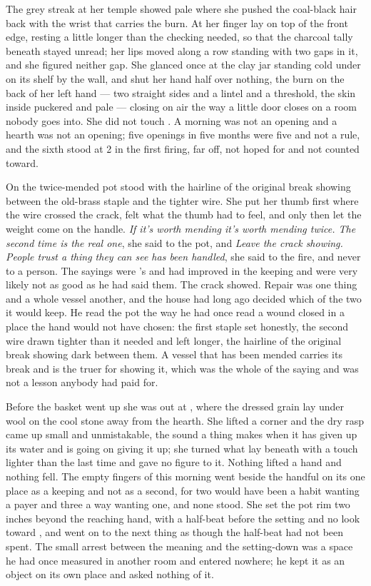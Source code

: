 The grey streak at her temple showed pale where she pushed the coal-black hair back with the wrist that carries the burn. At  her finger lay on top of the front edge, resting a little longer than the checking needed, so that the charcoal tally beneath stayed unread; her lips moved along a row standing with two gaps in it, and she figured neither gap. She glanced once at the clay jar standing cold under  on its shelf by the wall, and shut her hand half over nothing, the burn on the back of her left hand --- two straight sides and a lintel and a threshold, the skin inside puckered and pale --- closing on air the way a little door closes on a room nobody goes into. She did not touch . A morning was not an opening and a hearth was not an opening; five openings in five months were five and not a rule, and the sixth stood at  2 in the first firing, far off, not hoped for and not counted toward.

On  the twice-mended pot stood with the hairline of the original break showing between the old-brass staple and the tighter wire. She put her thumb first where the wire crossed the crack, felt what the thumb had to feel, and only then let the weight come on the handle. \emph{If it's worth mending it's worth mending twice. The second time is the real one}, she said to the pot, and \emph{Leave the crack showing. People trust a thing they can see has been handled}, she said to the fire, and never to a person. The sayings were 's and had improved in the keeping and were very likely not as good as he had said them. The crack showed. Repair was one thing and a whole vessel another, and the house had long ago decided which of the two it would keep. He read the pot the way he had once read a wound closed in a place the hand would not have chosen: the first staple set honestly, the second wire drawn tighter than it needed and left longer, the hairline of the original break showing dark between them. A vessel that has been mended carries its break and is the truer for showing it, which was the whole of the saying and was not a lesson anybody had paid for.

Before the basket went up she was out at , where the dressed grain lay under wool on the cool stone away from the hearth. She lifted a corner and the dry rasp came up small and unmistakable, the sound a thing makes when it has given up its water and is going on giving it up; she turned what lay beneath with a touch lighter than the last time and gave no figure to it. Nothing lifted a hand and nothing fell. The empty fingers of this morning went beside the handful on its one place as a keeping and not as a second, for two would have been a habit wanting a payer and three a way wanting one, and none stood. She set the pot rim two inches beyond the reaching hand, with a half-beat before the setting and no look toward , and went on to the next thing as though the half-beat had not been spent. The small arrest between the meaning and the setting-down was a space he had once measured in another room and entered nowhere; he kept it as an object on its own place and asked nothing of it.


